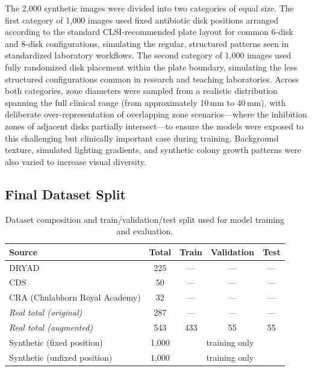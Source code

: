 The 2,000 synthetic images were divided into two categories of equal size. The first
category of 1,000 images used fixed antibiotic disk positions arranged according to the
standard CLSI-recommended plate layout for common 6-disk and 8-disk configurations,
simulating the regular, structured patterns seen in standardized laboratory workflows.
The second category of 1,000 images used fully randomized disk placement within the plate
boundary, simulating the less structured configurations common in research and teaching
laboratories. Across both categories, zone diameters were sampled from a realistic
distribution spanning the full clinical range (from approximately 10\,mm to 40\,mm),
with deliberate over-representation of overlapping zone scenarios---where the inhibition
zones of adjacent disks partially intersect---to ensure the models were exposed to this
challenging but clinically important case during training. Background texture, simulated
lighting gradients, and synthetic colony growth patterns were also varied to increase
visual diversity.

\subsection{Final Dataset Split}

\begin{table}[H]
  \centering
  \caption{Dataset composition and train/validation/test split used for model training and evaluation.}
  \label{tab:dataset_split}
  \begin{tabular}{lcccc}
    \toprule
    \textbf{Source} & \textbf{Total} & \textbf{Train} & \textbf{Validation} & \textbf{Test} \\
    \midrule
    DRYAD                              & 225   & ---   & ---   & ---   \\
    CDS                                & 50    & ---   & ---   & ---   \\
    CRA (Chulabhorn Royal Academy)     & 32    & ---   & ---   & ---   \\
    \textit{Real total (original)}     & 287   & ---   & ---   & ---   \\
    \textit{Real total (augmented)}    & 543   & 433   & 55    & 55    \\
    Synthetic (fixed position)         & 1,000 & \multicolumn{3}{c}{training only} \\
    Synthetic (unfixed position)       & 1,000 & \multicolumn{3}{c}{training only} \\
    \bottomrule
  \end{tabular}
\end{table}

